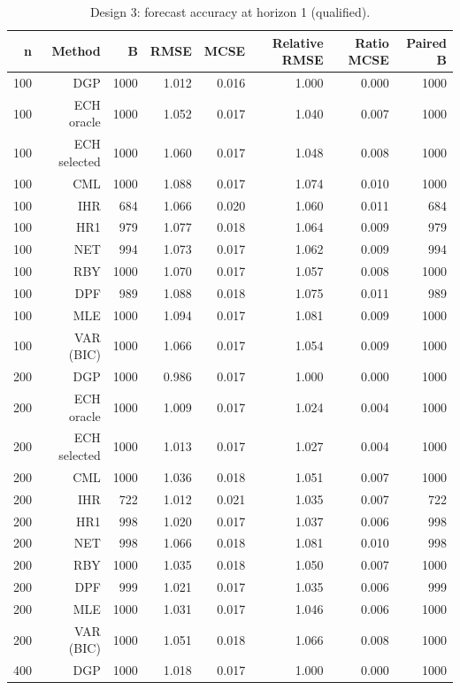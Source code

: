 \begin{table}[p]\centering
\caption{Design 3: forecast accuracy at horizon 1 (qualified).}
\small
\begin{tabular}{rrrrrrrr}\toprule
n & Method & B & RMSE & MCSE & Relative RMSE & Ratio MCSE & Paired B \\\midrule
100 & DGP & 1000 & 1.012 & 0.016 & 1.000 & 0.000 & 1000 \\
100 & ECH oracle & 1000 & 1.052 & 0.017 & 1.040 & 0.007 & 1000 \\
100 & ECH selected & 1000 & 1.060 & 0.017 & 1.048 & 0.008 & 1000 \\
100 & CML & 1000 & 1.088 & 0.017 & 1.074 & 0.010 & 1000 \\
100 & IHR &  684 & 1.066 & 0.020 & 1.060 & 0.011 &  684 \\
100 & HR1 &  979 & 1.077 & 0.018 & 1.064 & 0.009 &  979 \\
100 & NET &  994 & 1.073 & 0.017 & 1.062 & 0.009 &  994 \\
100 & RBY & 1000 & 1.070 & 0.017 & 1.057 & 0.008 & 1000 \\
100 & DPF &  989 & 1.088 & 0.018 & 1.075 & 0.011 &  989 \\
100 & MLE & 1000 & 1.094 & 0.017 & 1.081 & 0.009 & 1000 \\
100 & VAR (BIC) & 1000 & 1.066 & 0.017 & 1.054 & 0.009 & 1000 \\
200 & DGP & 1000 & 0.986 & 0.017 & 1.000 & 0.000 & 1000 \\
200 & ECH oracle & 1000 & 1.009 & 0.017 & 1.024 & 0.004 & 1000 \\
200 & ECH selected & 1000 & 1.013 & 0.017 & 1.027 & 0.004 & 1000 \\
200 & CML & 1000 & 1.036 & 0.018 & 1.051 & 0.007 & 1000 \\
200 & IHR &  722 & 1.012 & 0.021 & 1.035 & 0.007 &  722 \\
200 & HR1 &  998 & 1.020 & 0.017 & 1.037 & 0.006 &  998 \\
200 & NET &  998 & 1.066 & 0.018 & 1.081 & 0.010 &  998 \\
200 & RBY & 1000 & 1.035 & 0.018 & 1.050 & 0.007 & 1000 \\
200 & DPF &  999 & 1.021 & 0.017 & 1.035 & 0.006 &  999 \\
200 & MLE & 1000 & 1.031 & 0.017 & 1.046 & 0.006 & 1000 \\
200 & VAR (BIC) & 1000 & 1.051 & 0.018 & 1.066 & 0.008 & 1000 \\
400 & DGP & 1000 & 1.018 & 0.017 & 1.000 & 0.000 & 1000 \\

\end{tabular}
\end{table}
